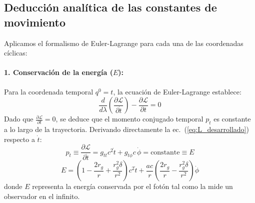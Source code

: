 \subsection{Deducción analítica de las constantes de movimiento}

Aplicamos el formalismo de Euler-Lagrange para cada una de las coordenadas cíclicas:

\paragraph{1. Conservación de la energía ($E$):}
Para la coordenada temporal $q^0 = t$, la ecuación de Euler-Lagrange establece:
\begin{equation}
    \frac{d}{d\lambda}\left( \frac{\partial \mathcal{L}}{\partial \dot{t}} \right) - \frac{\partial \mathcal{L}}{\partial t} = 0
    \label{eq:euler_lagrange_t}
\end{equation}
Dado que $\frac{\partial \mathcal{L}}{\partial t} = 0$, se deduce que el momento conjugado temporal $p_t$ es constante a lo largo de la trayectoria. Derivando directamente la ec.~(\ref{eq:L_desarrollado}) respecto a $\dot{t}$:
\begin{equation}
    p_t \equiv \frac{\partial \mathcal{L}}{\partial \dot{t}} = g_{tt} c^2 \dot{t} + g_{t\phi} c \, \dot{\phi} = \text{constante} \equiv E
    \label{eq:E_conservada_paso1}
\end{equation}
\begin{equation}
    E = \left(1 - \frac{2r_g}{r} + \frac{r_g^2 \delta}{r^2}\right) c^2 \dot{t} + \frac{a c}{r}\left(\frac{2r_g}{r} - \frac{r_g^2 \delta}{r^2}\right) \dot{\phi}
    \label{eq:E_conservada_def}
\end{equation}
donde $E$ representa la energía conservada por el fotón tal como la mide un observador en el infinito.


